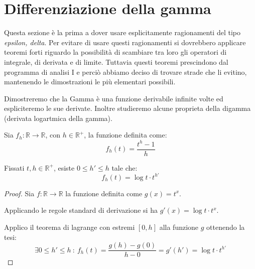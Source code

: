 \section{Differenziazione della gamma}\label{dg}
Questa sezione è la prima a dover usare esplicitamente ragionamenti del tipo \emph{epsilon, delta}.
Per evitare di usare questi ragionamenti si dovrebbero applicare teoremi forti riguardo la possibilità
di scambiare tra loro gli operatori di integrale, di derivata e di limite.
Tuttavia questi teoremi prescindono dal programma di analisi I e perciò abbiamo deciso di trovare strade
che li evitino, mantenendo le dimostrazioni le più elementari possibili.

Dimostreremo che la Gamma è una funzione derivabile infinite volte ed espliciteremo le sue derivate.
Inoltre studieremo alcune proprieta della digamma (derivata logartmica della gamma).

\begin{definition}
	Sia $f_h:\mathbb{R}\to\mathbb{R}$, con $h\in\mathbb{R^+}$, la funzione definita come:
	\begin{equation*}
		f_h(t)=\frac{t^h-1}h
	\end{equation*}

\end{definition}

\begin{lemma}\label{dg:LagrangeApprox}
	Fissati $t,h\in\mathbb{R^+}$, esiste $0\le h'\le h$ tale che:
	\begin{equation*}
		f_h(t)=\log{t}\cdot t^{h'}
	\end{equation*}
\end{lemma}
\begin{proof}
	Sia $f:\mathbb{R}\to\mathbb{R}$ la funzione definita come $g(x)=t^x$.
	
	Applicando le regole standard di derivazione si ha $g'(x)=\log{t}\cdot t^x$.
	
	Applico il teorema di lagrange con estremi $[0,h]$ alla funzione $g$ ottenendo la tesi:
	\begin{equation*}
		\exists 0\le h'\le h\ :\ f_h(t)=\frac{g(h)-g(0)}{h-0}=g'(h')=\log{t}\cdot t^{h'}
	\end{equation*}
\end{proof}



